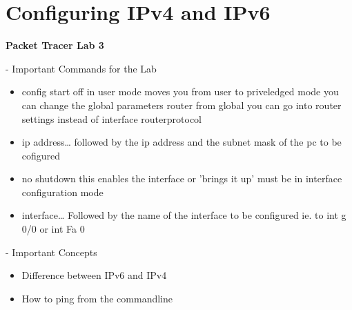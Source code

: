 \documentclass[../EngineeringJournal_CDavis.tex]{subfiles}
\begin{document}

\chapter[Configuring IPv4 and IPv6]{Configuring \linebreak[1] IPv4 and IPv6 \hspace*{\fill}{Jan 28, 2020}}
\noindent\textbf{{Packet Tracer Lab 3} }                             


\hspace{0.2cm}
\begin{tcolorbox}[width=6.3in]
\scriptsize 
- Important Commands for the Lab
  \begin{itemize}
    \item{config} start off in user mode
       moves you from user to priveledged mode
       you can change the global parameters
       router
       from global you can go into router settings instead of interface router{protocol}
    \item{ip address\dots} followed by the ip address and the subnet mask of the pc to be cofigured
    \item{no shutdown} this enables the interface or 'brings it up' must be in interface configuration mode
    \item{interface\dots} Followed by the name of the interface to be configured ie. 
       to int g 0/0 or int Fa 0 
  \end{itemize}
- Important Concepts
  \begin{itemize}
    \item{Difference between IPv6 and IPv4}
    \item{How to ping from the commandline}
  \end{itemize}
\end{tcolorbox}
\hspace{0.2cm}
\normalsize  

\newpage
\end{document}
